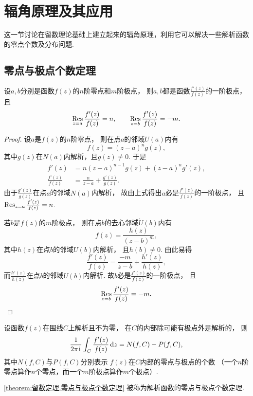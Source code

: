 \section{辐角原理及其应用}
这一节讨论在留数理论基础上建立起来的辐角原理，利用它可以解决一些解析函数的零点个数及分布问题.

\subsection{零点与极点个数定理}
\begin{lemma}
设\(a,b\)分别是函数\(f(z)\)的\(n\)阶零点和\(m\)阶极点，
则\(a,b\)都是函数\(\frac{f'(z)}{f(z)}\)的一阶极点，
且\[
	\operatorname*{Res}_{z=a} \frac{f'(z)}{f(z)} = n,
	\qquad
	\operatorname*{Res}_{z=b} \frac{f'(z)}{f(z)} = -m.
\]
\begin{proof}
设\(a\)是\(f(z)\)的\(n\)阶零点，
则在点\(a\)的邻域\(U(a)\)内有\[
	f(z) = (z-a)^n g(z),
\]
其中\(g(z)\)在\(N(a)\)内解析，且\(g(z)\neq0\).
于是\begin{align*}
	f'(z) &= n(z-a)^{n-1} g(z) + (z-a)^n g'(z), \\
	\frac{f'(z)}{f(z)} &= \frac{n}{z-a} + \frac{g'(z)}{g(z)}.
\end{align*}
由于\(\frac{g'(z)}{g(z)}\)在点\(a\)的邻域\(N(a)\)内解析，
故由上式得出\(a\)必是\(\frac{f'(z)}{f(z)}\)的一阶极点，
且\(\operatorname*{Res}_{z=a} \frac{f'(z)}{f(z)} = n\).

若\(b\)是\(f(z)\)的\(m\)阶极点，
则在点\(b\)的去心邻域\(\mathring{U}(b)\)内有\[
	f(z) = \frac{h(z)}{(z-b)^m},
\]
其中\(h(z)\)在点\(b\)的邻域\(U(b)\)内解析，
且\(h(b)\neq0\).
由此易得\[
	\frac{f'(z)}{f(z)}
	= \frac{-m}{z-b} + \frac{h'(z)}{h(z)},
\]
而\(\frac{h'(z)}{h(z)}\)在点\(b\)的邻域\(U(b)\)内解析.
故\(b\)必是\(\frac{f'(z)}{f(z)}\)的一阶极点，
且\[
	\operatorname*{Res}_{z=b} \frac{f'(z)}{f(z)} = -m.
	\qedhere
\]
\end{proof}
\end{lemma}

\begin{theorem}\label{theorem:留数定理.零点与极点个数定理}%
设函数\(f(z)\)在围线\(C\)上解析且不为零，
在\(C\)的内部除可能有极点外是解析的，
则\begin{equation}\label{equation:留数定理.零点与极点个数定理1}
	\frac{1}{2\pi\kern1pt\mathrm{i}\kern1pt}
	\int_C \frac{f'(z)}{f(z)} \dd{z}
	= N(f,C) - P(f,C),
\end{equation}
其中\(N(f,C)\)与\(P(f,C)\)分别表示
\(f(z)\)在\(C\)内部的零点与极点的个数
（一个\(n\)阶零点算作\(n\)个零点，而一个\(m\)阶极点算作\(m\)个极点）.
\end{theorem}
\cref{theorem:留数定理.零点与极点个数定理} 被称为{解析函数的零点与极点个数定理}.

